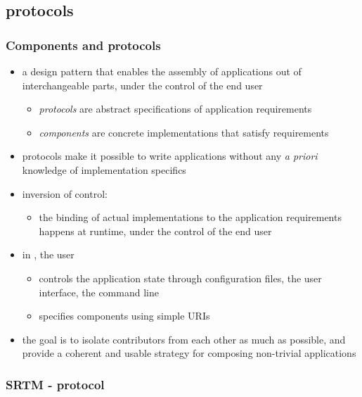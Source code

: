\subsection{protocols}
\begin{frame}
%
  \frametitle{Components and protocols}
%
  \begin{itemize}
%
  \item a design pattern\supercite{patterns} that enables the assembly of applications out of
    interchangeable parts, under the control of the end user
      \begin{itemize}
      \item \emph{protocols} are abstract specifications of application requirements
      \item \emph{components} are concrete implementations that satisfy requirements
      \end{itemize}
%
    \item protocols make it possible to write applications without any \emph{a priori} knowledge
      of implementation specifics
%
    \item inversion of control\supercite{johnson-88}:
      \begin{itemize}
      \item the binding of actual implementations to the application requirements happens at
        runtime, under the control of the end user
      \end{itemize}
%
    \item in \pyre, the user
      \begin{itemize}
      \item controls the application state through configuration files, the user interface, the
        command line
      \item specifies components using simple URIs
      \end{itemize}
%
    \item the goal is to isolate contributors from each other as much as possible, and provide
      a coherent and usable strategy for composing non-trivial applications
%
  \end{itemize}
%
\end{frame}

\begin{frame}
%
  \frametitle{SRTM - protocol}
%
  \begin{center}
  \end{center}
%
\end{frame}


